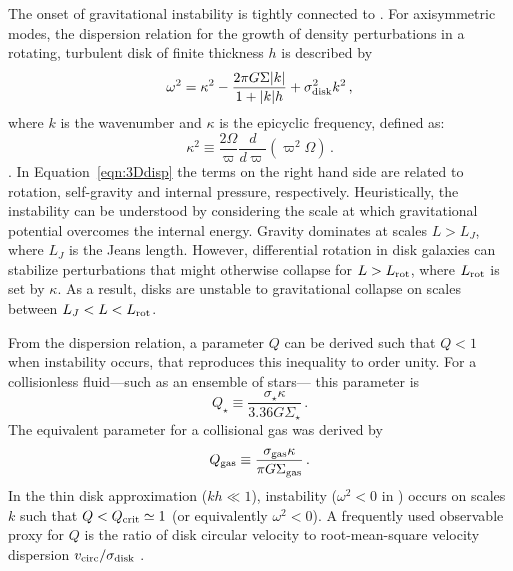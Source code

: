 \IfFileExists{emulateapjlegacy.cls}{\documentclass[iop]{emulateapjlegacy}}{\documentclass[iop]{emulateapj}}
\def\altomega{\varpi}
\begin{document}
The onset of gravitational instability is tightly connected to \SF \citep[e.g.,][]{Kennicutt89a, Wang94a, Li05b, Li06a}. For axisymmetric modes, the dispersion relation for the growth of density perturbations in a rotating, turbulent disk of finite thickness $h$ is described by
\begin{equation}
\omega^2 = \kappa^2 - \frac{2\pi G \Sigma |k|}{1 + |k| h} + \sigma_{\rm disk}^2 k^2\,,
\label{eqn:3Ddisp}
\end{equation}
where $k$ is the wavenumber and $\kappa$ is the epicyclic frequency, defined as:
\begin{equation}
\kappa^2\equiv\frac{2\Omega}{\altomega}\frac{d}{d\altomega}\left(\altomega^2\Omega\right)\,.
\label{eqn:kappa}
\end{equation}
\citep{Romeo92a}.
In Equation~\ref{eqn:3Ddisp} the terms on the right hand side are related to rotation, self-gravity and internal pressure, respectively. Heuristically, the instability can be understood by considering the scale at which gravitational potential overcomes the internal energy. Gravity dominates at scales $L > L_J$, where $L_J$ is the Jeans length. However, differential rotation in disk galaxies can stabilize perturbations that might otherwise collapse for $L > L_{\rm rot}$, where $L_{\rm rot}$ is set by $\kappa$. As a result, disks are unstable to gravitational collapse on scales between $L_J < L < L_{\rm rot}$.

From the dispersion relation, a parameter $Q$ can be derived such that $Q < 1$ when instability occurs, that reproduces this inequality to order unity. For a collisionless fluid---such as an ensemble of stars--- this parameter is \citep{Toomre64a}
\begin{equation}
Q_{\star} \equiv\frac{\sigma_{\star}\kappa}{3.36 G \Sigma_{\star}}\,.
\end{equation}
The equivalent parameter for a collisional gas was derived by \citet{Goldreich65a}
\begin{equation}
Q_{\rm gas}\equiv\frac{\sigma_{\rm gas}\kappa}{\pi G \Sigma_{\rm gas}}\,.
\label{eqn:Q}
\end{equation}
In the thin disk approximation ($kh\ll1$), instability ($\omega^2 < 0$ in  ) occurs on scales $k$ such that $Q < Q_{\rm crit}\simeq1$ (or equivalently $\omega^2 < 0$). A frequently used observable proxy for $Q$ is the ratio of disk circular velocity to root-mean-square velocity dispersion $v_{\rm circ}/\sigma_{\rm disk}$ \citep[e.g.,][]{GarciaBurillo03a, Genzel11a, Kassin12a, Leung19a}.
%
\end{document}
